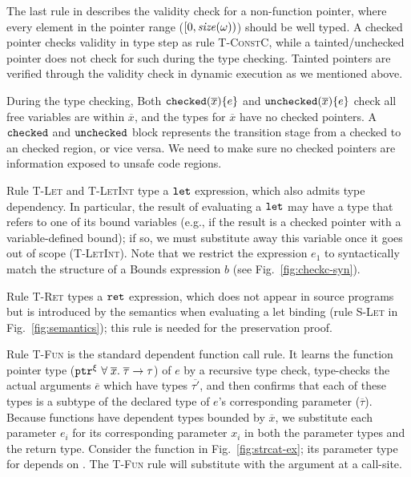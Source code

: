 The last rule in  describes the validity check for a non-function pointer, 
where every element in the pointer range ($[0,\mathit{size}(\omega))$) should be well typed.
A checked pointer checks validity in type step as rule \textsc{T-ConstC},
while a tainted/unchecked pointer does not check for such during the type checking.
Tainted pointers are verified through the validity check in dynamic execution as we mentioned above.


%
During the type checking,
Both $\mathtt{checked}({\overline{x}}){\{e\}}$ and $\mathtt{unchecked}({\overline{x}})\{e\}$
check all free variables are within $\overline{x}$,
and the types for $\overline{x}$ have no checked pointers.
A $\mathtt{checked}$ and $\mathtt{unchecked}$ block represents 
the transition stage from a checked to an checked region, or vice versa.
We need to make sure no checked pointers are information exposed to unsafe code regions.

%
Rule \textsc{T-Let} and \textsc{T-LetInt} type a $\mathtt{let}$ expression, which also admits
type dependency. In particular, the result of evaluating a $\mathtt{let}$
may have a type that refers to one of its bound variables (e.g., if
the result is a checked pointer with a variable-defined bound); if so,
we must substitute away this variable once it goes out of scope (\textsc{T-LetInt}). Note
that we restrict the expression $e_1$ to syntactically match the
structure of a Bounds expression $b$ (see Fig.~\ref{fig:checkc-syn}).

Rule \textsc{T-Ret} types a $\mathtt{ret}$ expression, which does not
appear in source programs but is introduced by the semantics when
evaluating a let binding (rule \textsc{S-Let} in
Fig.~\ref{fig:semantics}); this rule is needed for the preservation
proof.

Rule \textsc{T-Fun} is the standard dependent function call rule. It
learns the function pointer type ($\mathtt{ptr}^{\xi}~{\forall \;\overline{x}.\;{\overline{\tau}}\to\tau}$) of $e$ by a recursive type check,
type-checks the actual arguments $\overline{e}$ which have
types $\overline{\tau'}$, and then confirms that each of these types
is a subtype of the declared type of $e$'s corresponding parameter ($\overline{\tau}$). 
Because functions have dependent types bounded by $\overline{x}$, 
we substitute each parameter $e_i$ for
its corresponding parameter $x_i$ in both the parameter types and the
return type. Consider the  function in
Fig.~\ref{fig:strcat-ex}; its parameter type for  
depends on . The \textsc{T-Fun} rule will substitute 
 with the argument at a call-site.

